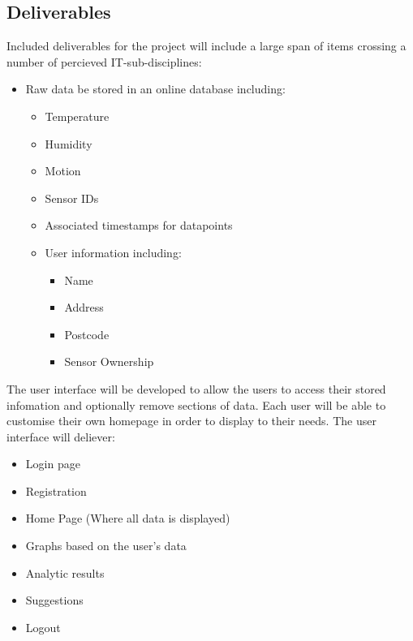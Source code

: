 \documentclass{article}
\begin{document}
        \newpage

        \subsection{Deliverables}
            Included deliverables for the project will include a large span of items crossing a number
            of percieved IT-sub-disciplines:
            \begin{itemize}
                \item Raw data be stored in an online database including:
                \begin{itemize}
                    \item Temperature
                    \item Humidity
                    \item Motion
                    \item Sensor IDs
                    \item Associated timestamps for datapoints
                    \item User information including:
                    \begin{itemize}
                        \item Name
                        \item Address
                        \item Postcode
                        \item Sensor Ownership
                    \end{itemize}
                \end{itemize}
            \end{itemize}

            The user interface will be developed to allow the users to access their stored
            infomation and optionally remove sections of data. Each user will be able to customise 
            their own homepage in order to display to their needs. The user interface will deliever:
            \begin{itemize}
                \item Login page
                \item Registration
                \item Home Page (Where all data is displayed)
                \item Graphs based on the user's data
                \item Analytic results
                \item Suggestions
                \item Logout
            \end{itemize}
            \newpage
\end{document}
